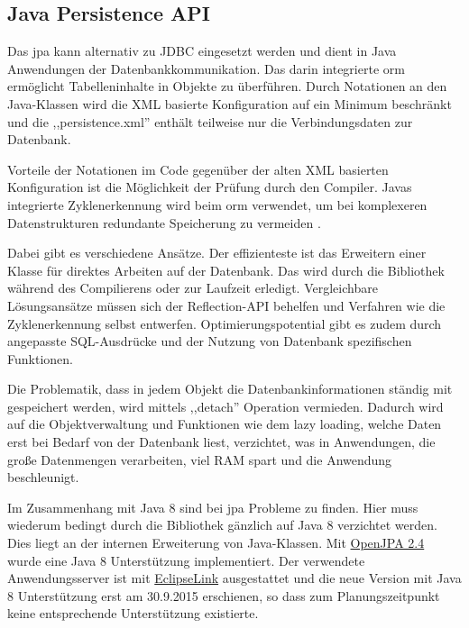 \documentclass[oneside, ngerman, toc=bibliography,bibliography=totoc,listof=entryprefix, open=right,numbers=noenddot,fontsize=12pt]{scrbook}
\begin{document}
\subsection{Java Persistence API}
\label{chap:jpa}

Das \acrfull{jpa} kann alternativ zu {JDBC} eingesetzt werden und dient in Java Anwendungen der Datenbankkommunikation. Das darin integrierte \acrfull{orm} ermöglicht Tabelleninhalte in Objekte zu überführen. Durch Notationen an den Java-Klassen wird die XML basierte Konfiguration auf ein Minimum beschränkt und die ,,persistence.xml'' enthält teilweise nur die Verbindungsdaten zur Datenbank.

Vorteile der Notationen im Code gegenüber der alten {XML} basierten Konfiguration ist die Möglichkeit der Prüfung durch den Compiler. Javas integrierte Zyklenerkennung wird beim \acrshort{orm} verwendet, um bei komplexeren Datenstrukturen redundante Speicherung zu vermeiden \cite{inden2012weg}.


Dabei gibt es verschiedene Ansätze. Der effizienteste ist das Erweitern einer Klasse für direktes Arbeiten auf der Datenbank. Das wird durch die Bibliothek während des Compilierens oder zur Laufzeit erledigt. Vergleichbare  Lösungsansätze müssen sich der Reflection-API behelfen und Verfahren wie die Zyklenerkennung selbst entwerfen.
Optimierungspotential gibt es zudem durch angepasste SQL-Ausdrücke und der Nutzung von Datenbank spezifischen Funktionen.

Die Problematik, dass in jedem Objekt die Datenbankinformationen ständig mit gespeichert werden, wird mittels {,,detach''} Operation vermieden. Dadurch wird auf die Objektverwaltung und Funktionen wie dem {lazy loading}, welche Daten erst bei Bedarf von der Datenbank liest, verzichtet, was in Anwendungen, die große Datenmengen verarbeiten, viel RAM spart und die Anwendung beschleunigt.

Im  Zusammenhang mit Java 8 sind bei \acrshort{jpa} Probleme zu finden. Hier muss wiederum bedingt durch die Bibliothek gänzlich auf Java 8 verzichtet werden.
Dies liegt an der internen Erweiterung von Java-Klassen. Mit \href{http://openjpa.apache.org/openjpa-2.4.x.html}{OpenJPA 2.4} wurde eine Java 8 Unterstützung implementiert. Der verwendete Anwendungsserver ist mit \href{http://www.eclipse.org/eclipselink/}{EclipseLink} ausgestattet und die neue Version mit Java 8 Unterstützung erst am 30.9.2015 erschienen, so dass zum Planungszeitpunkt keine entsprechende Unterstützung existierte.
\end{document}

